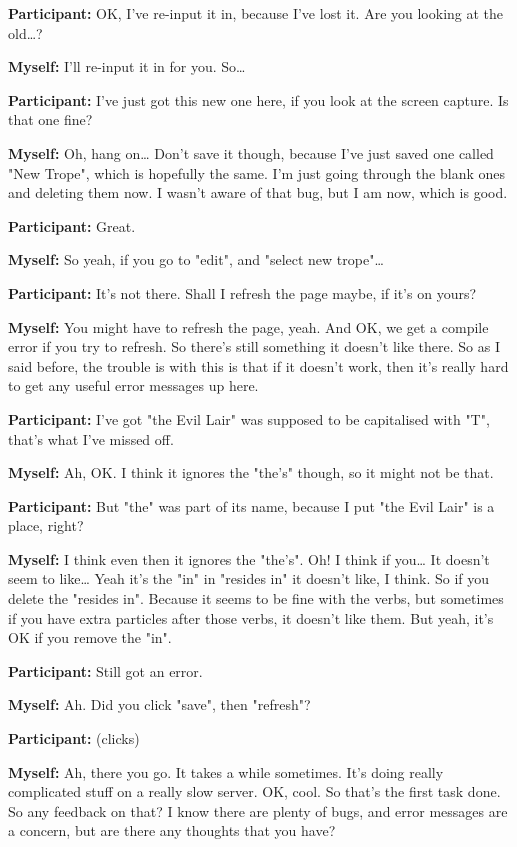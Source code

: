 \documentclass[11pt]{report}
\newcommand{\llabel}[1]{\hypertarget{llineno:#1}{\linelabel{#1}}}
\begin{document}
\begin{linenumbers}
\textbf{Participant:} OK, I've re-input it in, because I've lost it. Are you looking at the old\ldots{}?

\textbf{Myself:} I'll re-input it in for you. So\ldots{}

\textbf{Participant:} I've just got this new one here, if you look at the screen capture. Is that one fine?

\textbf{Myself:} Oh, hang on\ldots{} Don't save it though, because I've just saved one called "New Trope", which is hopefully the same. I'm just going through the blank ones and deleting them now. I wasn't aware of that bug, but I am now, which is good.

\textbf{Participant:} Great.

\textbf{Myself:} So yeah, if you go to "edit", and "select new trope"\ldots{}

\textbf{Participant:} It's not there. Shall I refresh the page maybe, if it's on yours?

\textbf{Myself:} You might have to refresh the page, yeah. And OK, we get a compile error if you try to refresh. So there's still something it doesn't like there. So as I said before, the trouble is with this is that if it doesn't work, then it's really hard to get any useful error messages up here.

\textbf{Participant:} I've got "the Evil Lair" was supposed to be capitalised
with "T", that's what I've missed off.\llabel{lne:syntax3a}

\textbf{Myself:} Ah, OK. I think it ignores the "the's" though, so it might not be that.

\textbf{Participant:} But "the" was part of its name, because I put "the Evil Lair" is a place, right?

\textbf{Myself:} I think even then it ignores the "the's". Oh! I think if you\ldots{} It doesn't seem to like\ldots{} Yeah it's the "in" in "resides in" it doesn't like, I think. So if you delete the "resides in". Because it seems to be fine with the verbs, but sometimes if you have extra particles after those verbs, it doesn't like them. But yeah, it's OK if you remove the "in".

\textbf{Participant:} Still got an error.

\textbf{Myself:} Ah. Did you click "save", then "refresh"?

\textbf{Participant:} (clicks)

\textbf{Myself:} Ah, there you go. It takes a while sometimes. It's doing really complicated stuff on a really slow server. OK, cool. So that's the first task done. So any feedback on that? I know there are plenty of bugs, and error messages are a concern, but are there any thoughts that you have?


\end{linenumbers}
\end{document}
